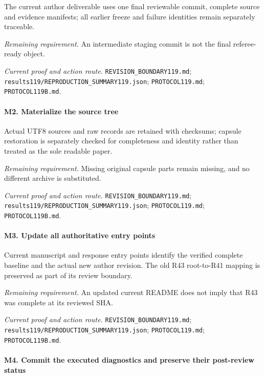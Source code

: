 The current author deliverable uses one final reviewable commit, complete source and evidence manifests; all earlier freeze and failure identities remain separately traceable.

\par\emph{Remaining requirement.} An intermediate staging commit is not the final referee-ready object.

\par\emph{Current proof and action route.} \nolinkurl{REVISION_BOUNDARY119.md}; \nolinkurl{results119/REPRODUCTION_SUMMARY119.json}; \nolinkurl{PROTOCOL119.md}; \nolinkurl{PROTOCOL119B.md}.

\paragraph{M2. Materialize the source tree}

Actual UTF8 sources and raw records are retained with checksums; capsule restoration is separately checked for completeness and identity rather than treated as the sole readable paper.

\par\emph{Remaining requirement.} Missing original capsule parts remain missing, and no different archive is substituted.

\par\emph{Current proof and action route.} \nolinkurl{REVISION_BOUNDARY119.md}; \nolinkurl{results119/REPRODUCTION_SUMMARY119.json}; \nolinkurl{PROTOCOL119.md}; \nolinkurl{PROTOCOL119B.md}.

\paragraph{M3. Update all authoritative entry points}

Current manuscript and response entry points identify the verified complete baseline and the actual new author revision. The old R43 root-to-R41 mapping is preserved as part of its review boundary.

\par\emph{Remaining requirement.} An updated current README does not imply that R43 was complete at its reviewed SHA.

\par\emph{Current proof and action route.} \nolinkurl{REVISION_BOUNDARY119.md}; \nolinkurl{results119/REPRODUCTION_SUMMARY119.json}; \nolinkurl{PROTOCOL119.md}; \nolinkurl{PROTOCOL119B.md}.

\paragraph{M4. Commit the executed diagnostics and preserve their post-review status}

